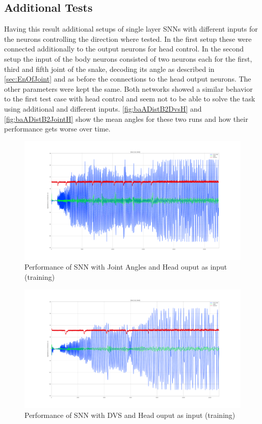 \subsection{Additional Tests}
Having this result additional setups of single layer SNNs with different inputs for the neurons controlling the direction where tested. In the first setup these were connected additionally to the output neurons for head control. In the second setup the input of the body neurons consisted of two neurons each for the first, third and fifth joint of the snake, decoding its angle as described in \autoref{sec:EnOfJoint} and as before the connections to the head output neurons. The other parameters were kept the same.
Both networks showed a similar behavior to the first test case with head control and seem not to be able to solve the task using additional and different inputs. \autoref{fig:baADistB2DvsH} and \autoref{fig:baADistB2JointH} show the mean angles for these two runs and how their performance gets worse over time.

\begin{figure}[htpb]
  \centering
  \includegraphics[width=\textwidth]{figures/plots/baADistB2JointH}
  \caption{ Performance of SNN with Joint Angles and Head ouput as input (training) }
  \label{fig:baADistB2JointH}
\end{figure}
\begin{figure}[htpb]
  \centering
  \includegraphics[width=\textwidth]{figures/plots/baADistB2DvsH}
  \caption{ Performance of SNN with DVS and Head ouput as input (training)  }
  \label{fig:baADistB2DvsH}
\end{figure}

